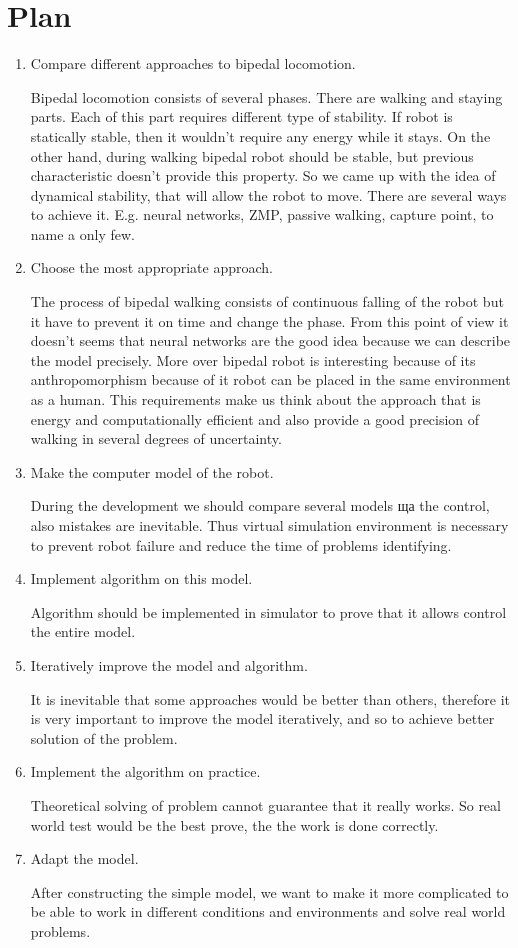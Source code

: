 \documentclass[11pt,a4paper]{article}
\begin{document}
\section{Plan}
\begin{enumerate}
	\item
		Compare different approaches to bipedal locomotion.
		
		Bipedal locomotion consists of several phases. There are walking and staying parts. Each of this part requires different type of stability. If robot is statically stable, then it wouldn't require any energy while it stays. On the other hand, during walking bipedal robot should be stable, but previous characteristic doesn't provide this property. So we came up with the idea of dynamical stability, that will allow the robot to move. 
		There are several ways to achieve it. E.g. neural networks, ZMP, passive walking, capture point, to name a only few.
	\item
		Choose the most appropriate approach.
		
		The process of bipedal walking consists of continuous falling of the robot but it have to prevent it on time and change the phase. From this point of view it doesn't seems that neural networks are the good idea because we can describe the model precisely. More over bipedal robot is interesting because of its anthropomorphism because of it robot can be placed in the same environment as a human. This requirements make us think about the approach that is energy and computationally efficient and also provide a good precision of walking in several degrees of uncertainty.  
	\item
		Make the computer model of the robot.
		
		During the development we should compare several models ща the control, also mistakes are inevitable. Thus virtual simulation environment is necessary to prevent robot failure and reduce the time of problems identifying.
	\item
		Implement algorithm on this model.
		
		Algorithm should be implemented in simulator to prove that it allows control the entire model.  
	\item
		Iteratively improve the model and algorithm.
		
		It is inevitable that some approaches would be better than others, therefore  	
		it is very important to improve the model iteratively, and so to achieve better solution of the problem. 
	\item
		Implement the algorithm on practice.
		
		Theoretical solving of problem cannot guarantee that it really works. So real world test would be the best prove, the the work is done correctly.
	\item
		Adapt the model.
		
		After constructing the simple model, we want to make it more complicated to be able to work in different conditions and environments and solve real world problems. 
\end{enumerate}
\end{document}
